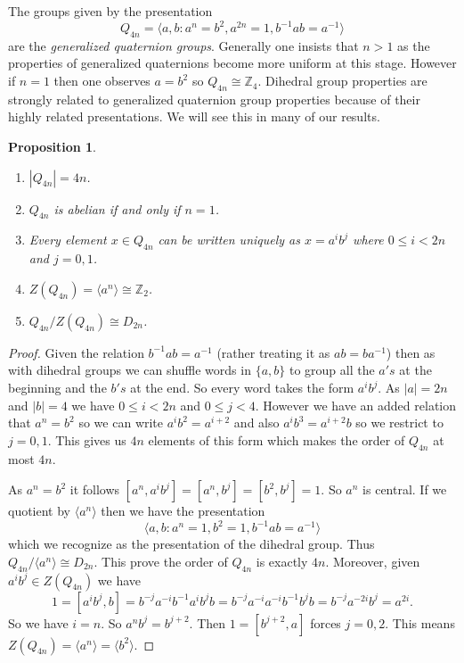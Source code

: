 \documentclass[12pt]{article}
\newtheorem{prop}[thm]{Proposition}
\begin{document}
The groups given by the presentation
\[Q_{4n}=\langle a,b : a^n=b^2, a^{2n}=1, b^{-1}ab=a^{-1}\rangle\]
are the \emph{generalized quaternion groups}.  Generally one insists that $n>1$
as the properties of generalized quaternions become more uniform at this stage.
However if $n=1$ then one observes $a=b^2$ so $Q_{4n}\cong\mathbb{Z}_4$.
Dihedral group properties are strongly related to generalized quaternion
group properties because of their highly related presentations.  We will see this in many of our results.

\begin{prop}
\begin{enumerate}
\item $|Q_{4n}|=4n$.
\item $Q_{4n}$ is abelian if and only if $n=1$.
\item Every element $x\in Q_{4n}$ can be written uniquely as $x=a^i b^j$
where $0\leq i<2n$ and $j=0,1$.
\item $Z(Q_{4n})=\langle a^n\rangle\cong \mathbb{Z}_2$.
\item $Q_{4n}/Z(Q_{4n})\cong D_{2n}$.
\end{enumerate}
\end{prop}
\begin{proof}
Given the relation $b^{-1} ab=a^{-1}$ (rather treating it as $ab=ba^{-1}$) then 
as with dihedral groups we can 
shuffle words in $\{a,b\}$ to group all the $a's$ at the beginning and the
$b's$ at the end.  So every word takes the form $a^i b^j$.  As $|a|=2n$
and $|b|=4$ we have $0\leq i<2n$ and $0\leq j<4$.  However we have an 
added relation that $a^n=b^2$ so we can write $a^i b^2=a^{i+2}$ and
also $a^i b^3=a^{i+2}b$ so we restrict to $j=0,1$.  This gives us $4n$ elements
of this form which makes the order of $Q_{4n}$ at most $4n$.

As $a^n=b^2$ it follows $[a^n,a^i b^j]=[a^n,b^j]=[b^2,b^j]=1$.  So
$a^n$ is central.  If we quotient by $\langle a^n\rangle$ then we have
the presentation
\[\langle a,b:a^n=1, b^2=1, b^{-1} ab=a^{-1}\rangle\]
which we recognize as the presentation of the dihedral group.  Thus
$Q_{4n}/\langle a^n\rangle\cong D_{2n}$.  This prove the order of $Q_{4n}$
is exactly $4n$.  Moreover, given $a^i b^j\in Z(Q_{4n})$ we have
\[1=[a^i b^j, b]=b^{-j}a^{-i} b^{-1} a^{i} b^j b
   = b^{-j} a^{-i} a^{-i} b^{-1} b^j b
   = b^{-j} a^{-2i} b^j
   = a^{2i}.\]
So we have $i=n$.  So $a^n b^j=b^{j+2}$.  Then $1=[b^{j+2},a]$ forces $j=0,2$.
This means $Z(Q_{4n})=\langle a^n\rangle=\langle b^2\rangle$.  
\end{proof}
\end{document}
